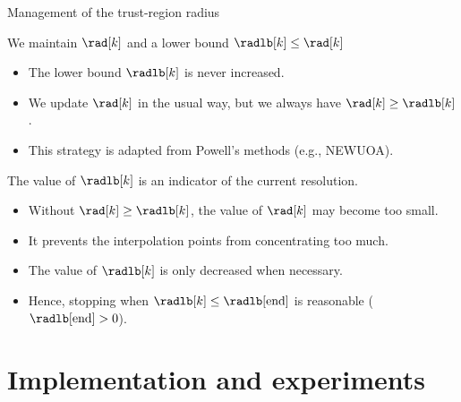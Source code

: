 \documentclass[optimization]{common/talk}
\begin{document}
\begin{frame}{Management of the trust-region radius}
    \begin{block}{We maintain $\rad[k]$ and a lower bound $\radlb[k] \le \rad[k]$}
        \begin{itemize}
            \item The lower bound $\radlb[k]$ is \alert{never} increased.
            \item We update $\rad[k]$ in the usual way, but we \alert{always} have $\rad[k] \ge \radlb[k]$.
            \item This strategy is adapted from \alert{Powell}'s methods (e.g., NEWUOA).
        \end{itemize}
    \end{block}

    The value of $\radlb[k]$ is an indicator of the current \alert{resolution}.

    \begin{itemize}
        \item Without $\rad[k] \ge \radlb[k]$, the value of $\rad[k]$ may become too small.
        \item It prevents the interpolation points from \alert{concentrating} too much.
        \item The value of $\radlb[k]$ is only \alert{decreased} when necessary.
        \item Hence, stopping when $\radlb[k] \le \radlb[\textrm{end}]$ is \alert{reasonable} ($\radlb[\textrm{end}] > 0$).
    \end{itemize}
\end{frame}

\section{Implementation and experiments}
\end{document}
